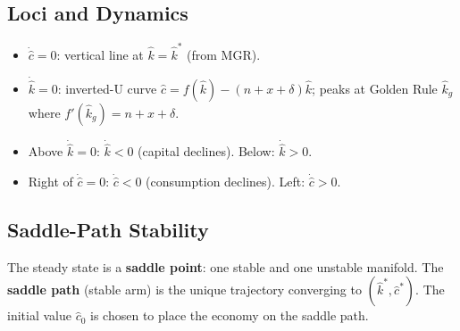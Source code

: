 \documentclass[a4paper,11pt]{article}
\newcommand{\khat}{\hat{k}}
\newcommand{\chat}{\hat{c}}
\begin{document}
\subsection*{Loci and Dynamics}
\begin{itemize}[leftmargin=*]
  \item $\dot{\chat} = 0$: vertical line at $\khat = \khat^*$ (from MGR).
  \item $\dot{\khat} = 0$: inverted-U curve $\chat = f(\khat) - (n+x+\delta)\khat$; peaks at Golden Rule $\khat_g$ where $f'(\khat_g) = n+x+\delta$.
  \item Above $\dot{\khat}=0$: $\dot{\khat} < 0$ (capital declines). Below: $\dot{\khat} > 0$.
  \item Right of $\dot{\chat}=0$: $\dot{\chat} < 0$ (consumption declines). Left: $\dot{\chat} > 0$.
\end{itemize}

\subsection*{Saddle-Path Stability}
The steady state is a \textbf{saddle point}: one stable and one unstable manifold. The \textbf{saddle path} (stable arm) is the unique trajectory converging to $(\khat^*, \chat^*)$. The initial value $\chat_0$ is chosen to place the economy on the saddle path.
\end{document}

